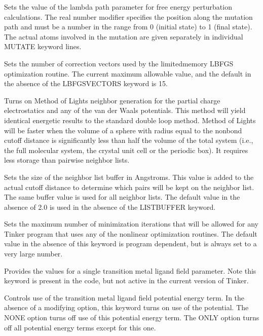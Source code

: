 \documentclass[letterpaper,11pt,english]{sphinxmanual}
\begin{document}

  Sets the value of the lambda path parameter for free energy perturbation calculations. The real number modifier specifies the position along the mutation path and must be a number in the range from 0 (initial state) to 1 (final state). The actual atoms involved in the mutation are given separately in individual MUTATE keyword lines.

  Sets the number of correction vectors used by the limited\sphinxhyphen{}memory L\sphinxhyphen{}BFGS optimization routine. The current maximum allowable value, and the default in the absence of the LBFGS\sphinxhyphen{}VECTORS keyword is 15.


  Turns on Method of Lights neighbor generation for the partial charge electrostatics and any of the van der Waals potentials. This method will yield identical energetic results to the standard double loop method. Method of Lights will be faster when the volume of a sphere with radius equal to the nonbond cutoff distance is significantly less than half the volume of the total system (i.e., the full molecular system, the crystal unit cell or the periodic box). It requires less storage than pairwise neighbor lists.

  Sets the size of the neighbor list buffer in Angstroms. This value is added to the actual cutoff distance to determine which pairs will be kept on the neighbor list. The same buffer value is used for all neighbor lists. The default value in the absence of 2.0 is used in the absence of the LIST\sphinxhyphen{}BUFFER keyword.

  Sets the maximum number of minimization iterations that will be allowed for any Tinker program that uses any of the nonlinear optimization routines. The default value in the absence of this keyword is program dependent, but is always set to a very large number.

  Provides the values for a single transition metal ligand field parameter. Note this keyword is present in the code, but not active in the current version of Tinker.

  Controls use of the transition metal ligand field potential energy term. In the absence of a modifying option, this keyword turns on use of the potential. The NONE option turns off use of this potential energy term. The ONLY option turns off all potential energy terms except for this one.
\end{document}
